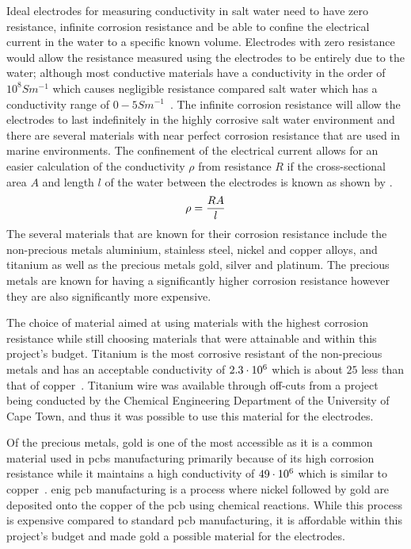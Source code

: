 Ideal electrodes for measuring conductivity in salt water need to have zero resistance, infinite corrosion resistance and be able to confine the electrical current in the water to a specific known volume.
Electrodes with zero resistance would allow the resistance measured using the electrodes to be entirely due to the water; although most conductive materials have a conductivity in the order of $10^8 Sm^{-1}$ which causes negligible resistance compared salt water which has a conductivity range of $0-5 Sm^{-1}$~\cite{as_typical_conductivity_2022}.
The infinite corrosion resistance will allow the electrodes to last indefinitely in the highly corrosive salt water environment and there are several materials with near perfect corrosion resistance that are used in marine environments.
The confinement of the electrical current allows for an easier calculation of the conductivity $\rho$ from resistance $R$ if the cross-sectional area $A$ and length $l$ of the water between the electrodes is known as shown by .
\begin{equation}
    \rho = \frac{\displaystyle RA}{\displaystyle l}
    \label{eqn:conductivity-from-resistance}
\end{equation}
The several materials that are known for their corrosion resistance include the non-precious metals aluminium, stainless steel, nickel and copper alloys, and titanium as well as the precious metals gold, silver and platinum.
The precious metals are known for having a significantly higher corrosion resistance however they are also significantly more expensive.

The choice of material aimed at using materials with the highest corrosion resistance while still choosing materials that were attainable and within this project's budget.
Titanium is the most corrosive resistant of the non-precious metals and has an acceptable conductivity of $2.3\cdot10^{6}$ which is about $25$ less than that of copper~\cite{walsh_electrodes_conductivity_1991}.
Titanium wire was available through off-cuts from a project being conducted by the Chemical Engineering Department of the University of Cape Town, and thus it was possible to use this material for the electrodes.

Of the precious metals, gold is one of the most accessible as it is a common material used in \glspl{pcb} manufacturing primarily because of its high corrosion resistance while it maintains a high conductivity of $49\cdot10^{6}$ which is similar to copper~\cite{walsh_electrodes_conductivity_1991}.
\gls{enig} \gls{pcb} manufacturing is a process where nickel followed by gold are deposited onto the copper of the \gls{pcb} using chemical reactions.
While this process is expensive compared to standard \gls{pcb} manufacturing, it is affordable within this project's budget and made gold a possible material for the electrodes.

